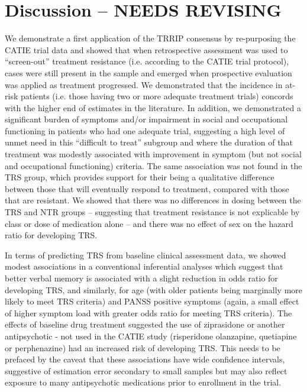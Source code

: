 \documentclass[a4paper,nobib]{article}
\begin{document}
\section{Discussion -- NEEDS REVISING}
We demonstrate a first application of the TRRIP consensus by re-purposing the CATIE trial data and showed that when retrospective assessment was used to ``screen-out'' treatment resistance (i.e. according to the CATIE trial protocol), cases were still present in the sample and emerged when prospective evaluation was applied as treatment progressed.  We demonstrated that the incidence in at-risk patients (i.e. those having two or more adequate treatment trials) concords with the higher end of estimates in the literature.  In addition, we demonstrated a significant burden of symptoms and/or impairment in social and occupational functioning in patients who had one adequate trial, suggesting a high level of unmet need in this ``difficult to treat'' subgroup and where the duration of that treatment was modestly associated with improvement in symptom (but not social and occupational functioning) criteria.  The same association was not found in the TRS group, which provides support for their being a qualitative difference between those that will eventually respond to treatment, compared with those that are resistant.  We showed that there was no differences in dosing between the TRS and NTR groups -- suggesting that treatment resistance is not explicable by class or dose of medication alone -- and there was no effect of sex on the hazard ratio for developing TRS.  

In terms of predicting TRS from baseline clinical assessment data, we showed modest associations in a conventional inferential analyses which suggest that better verbal memory is associated with a slight reduction in odds ratio for developing TRS, and similarly, for age (with older patients being marginally more likely to meet TRS criteria) and PANSS positive symptoms (again, a small effect of higher symptom load with greater odds ratio for meeting TRS criteria).  The effects of baseline drug treatment suggested the use of ziprasidone or another antipsychotic - not used in the CATIE study (risperidone olanzapine, quetiapine or perphenazine) had an increased risk of developing TRS. This needs to be prefaced by the caveat that these associations have wide confidence intervals, suggestive of estimation error secondary to small samples but may also reflect exposure to many antipsychotic medications prior to enrollment in the trial. 
\end{document}
